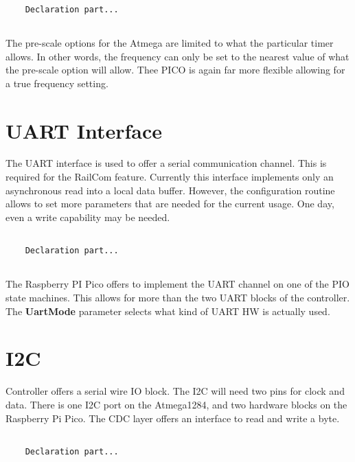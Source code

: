 \lstset{language=c++, style=codesnippetstyle}
\begin{lstlisting}
   
    Declaration part...
    
\end{lstlisting}

The pre-scale options for the Atmega are limited to what the particular timer allows. In other words, the frequency can only be set to the nearest value of what the pre-scale option will allow. Thee PICO is again far more flexible allowing for a true frequency setting.

\section{UART Interface}

The UART interface is used to offer a serial communication channel. This is required for the RailCom feature. Currently this interface implements only an asynchronous read into a local data buffer. However, the configuration routine allows to set more parameters that are needed for the current usage. One day, even a write capability may be needed.

\lstset{language=c++, style=codesnippetstyle}
\begin{lstlisting}
   
    Declaration part...
    
\end{lstlisting}

The Raspberry PI Pico offers to implement the UART channel on one of the PIO state machines. This allows for more than the two UART blocks of the controller. The \textbf{UartMode} parameter selects what kind of UART HW is actually used.

\section{I2C}

Controller offers a serial wire IO block. The I2C will need two pins for clock and data. There is one I2C port on the Atmega1284, and two hardware blocks on the Raspberry Pi Pico. The CDC layer offers an interface to read and write a byte.

\lstset{language=c++, style=codesnippetstyle}
\begin{lstlisting}
   
    Declaration part...
    
\end{lstlisting}

